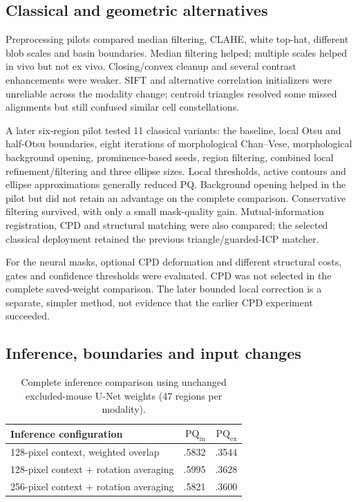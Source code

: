 \documentclass[11pt]{article}
\newcommand{\PQ}{\mathrm{PQ}}
\begin{document}
\subsection{Classical and geometric alternatives}
Preprocessing pilots compared median filtering, CLAHE, white top-hat, different blob scales and basin boundaries. Median filtering helped; multiple scales helped in vivo but not ex vivo. Closing/convex cleanup and several contrast enhancements were weaker. SIFT and alternative correlation initializers were unreliable across the modality change; centroid triangles resolved some missed alignments but still confused similar cell constellations.

A later six-region pilot tested 11 classical variants: the baseline, local Otsu and half-Otsu boundaries, eight iterations of morphological Chan--Vese, morphological background opening, prominence-based seeds, region filtering, combined local refinement/filtering and three ellipse sizes. Local thresholds, active contours and ellipse approximations generally reduced PQ. Background opening helped in the pilot but did not retain an advantage on the complete comparison. Conservative filtering survived, with only a small mask-quality gain. Mutual-information registration, CPD and structural matching were also compared; the selected classical deployment retained the previous triangle/guarded-ICP matcher.

For the neural masks, optional CPD deformation and different structural costs, gates and confidence thresholds were evaluated. CPD was not selected in the complete saved-weight comparison. The later bounded local correction is a separate, simpler method, not evidence that the earlier CPD experiment succeeded.

\subsection{Inference, boundaries and input changes}
\begin{table}[htbp]
\centering\small
\caption{Complete inference comparison using unchanged excluded-mouse U-Net weights (47 regions per modality).}
\begin{tabular}{@{}lrr@{}}
\toprule
Inference configuration & $\PQ_{\mathrm{in}}$ & $\PQ_{\mathrm{ex}}$\\
\midrule
128-pixel context, weighted overlap & .5832 & .3544\\
128-pixel context + rotation averaging & .5995 & .3628\\
256-pixel context + rotation averaging & .5821 & .3600\\
\bottomrule
\end{tabular}
\end{table}
\end{document}

